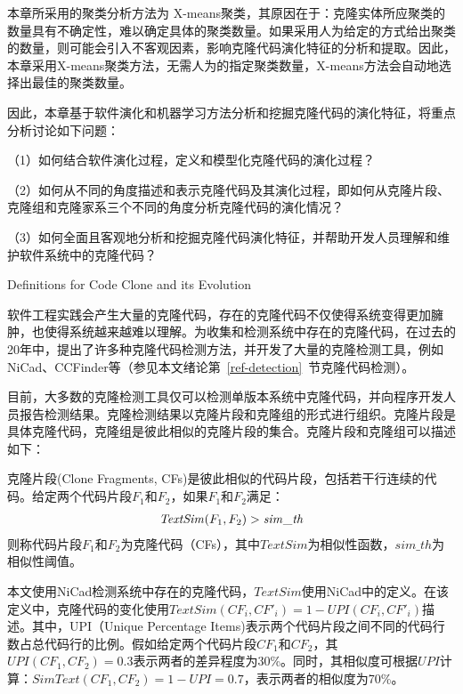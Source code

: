 本章所采用的聚类分析方法为 X-means\cite{pelleg2000x}聚类，其原因在于：克隆实体所应聚类的数量具有不确定性，难以确定具体的聚类数量。如果采用人为给定的方式给出聚类的数量，则可能会引入不客观因素，影响克隆代码演化特征的分析和提取。因此，本章采用X-means聚类方法，无需人为的指定聚类数量，X-means方法会自动地选择出最佳的聚类数量。

因此，本章基于软件演化和机器学习方法分析和挖掘克隆代码的演化特征，将重点分析讨论如下问题：

（1）如何结合软件演化过程，定义和模型化克隆代码的演化过程？

（2）如何从不同的角度描述和表示克隆代码及其演化过程，即如何从克隆片段、克隆组和克隆家系三个不同的角度分析克隆代码的演化情况？

（3）如何全面且客观地分析和挖掘克隆代码演化特征，并帮助开发人员理解和维护软件系统中的克隆代码？%

{Definitions for Code Clone and its Evolution}
\label{lab-evolution}

软件工程实践会产生大量的克隆代码，存在的克隆代码不仅使得系统变得更加臃肿，也使得系统越来越难以理解。为收集和检测系统中存在的克隆代码，在过去的20年中，提出了许多种克隆代码检测方法，并开发了大量的克隆检测工具，例如NiCad\cite{roy2008nicad}、CCFinder\cite{kamiya2002ccfinder}等（参见本文绪论第~\ref{ref-detection}~节克隆代码检测）。

目前，大多数的克隆检测工具仅可以检测单版本系统中克隆代码，并向程序开发人员报告检测结果。克隆检测结果以克隆片段和克隆组的形式进行组织。克隆片段是具体克隆代码，克隆组是彼此相似的克隆片段的集合。克隆片段和克隆组可以描述如下：

\begin{definition}[克隆片段]
\label{defn-clonefragment}
克隆片段(Clone Fragments, CFs)是彼此相似的代码片段，包括若干行连续的代码。给定两个代码片段$F_1$和$F_2$，如果$F_1$和$F_2$满足：
\[
  \begin{array}[t]{c}
    \mathit{TextSim}(F_1, F_2) > \mathit{sim\_th} \\
  \end{array}
\]
则称代码片段$F_1$和$F_2$为克隆代码（CFs），其中$TextSim$为相似性函数，$sim\_th$为相似性阈值。
\end{definition}

本文使用NiCad检测系统中存在的克隆代码，$TextSim$使用NiCad中的定义。在该定义中，克隆代码的变化使用$\mathit{TextSim}(CF_i, CF'_i)= 1 - UPI(CF_i, CF'_i)$描述。其中，UPI（Unique Percentage Items\cite{roy2008nicad})表示两个代码片段之间不同的代码行数占总代码行的比例。假如给定两个代码片段$CF_1$和$CF_2$，其$UPI(CF_1,CF_2)=0.3$表示两者的差异程度为30\%。同时，其相似度可根据$UPI$计算：$SimText (CF_1,CF_2)=1-UPI=0.7$，表示两者的相似度为70\%。

